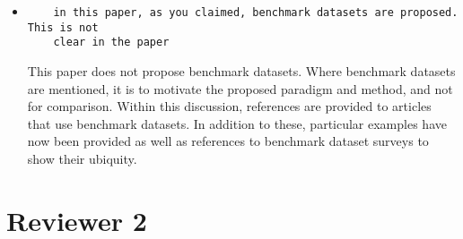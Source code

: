 \documentclass[11pt]{article}
\begin{document}
\begin{itemize}
\item
\begin{verbatim}
    in this paper, as you claimed, benchmark datasets are proposed. This is not
    clear in the paper
\end{verbatim}

This paper does not propose benchmark datasets. Where benchmark datasets are
mentioned, it is to motivate the proposed paradigm and method, and not for
comparison. Within this discussion, references are provided to articles that use
benchmark datasets. In addition to these, particular examples have now been
provided as well as references to benchmark dataset surveys to show their
ubiquity.


\end{itemize}

\section*{Reviewer 2}
\end{document}
